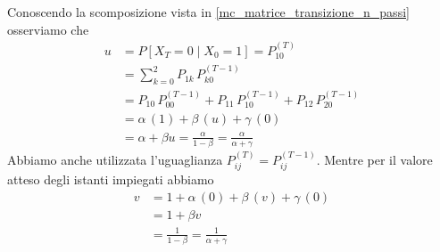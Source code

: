 \documentclass{article}
\begin{document}
Conoscendo la scomposizione vista in \ref{mc_matrice_transizione_n_passi} osserviamo che
\begin{align*}
u &= P[X_T = 0 \mid X_0 = 1] = P_{10}^{(T)}\\
&= \sum_{k = 0}^2 P_{1k}\,P_{k0}^{(T-1)}\\
&= P_{10}\,P_{00}^{(T-1)} + P_{11}\,P_{10}^{(T-1)} + P_{12}\,P_{20}^{(T-1)}\\
&= \alpha\,(1) + \beta\,(u) + \gamma\,(0)\\
&= \alpha + \beta u = \frac{\alpha}{1-\beta} = \frac{\alpha}{\alpha + \gamma}
\end{align*}
Abbiamo anche utilizzata l'uguaglianza $P_{ij}^{(T)} = P_{ij}^{(T-1)}$. Mentre per il valore atteso degli istanti impiegati abbiamo
\begin{align*}
v &= 1 + \alpha\,(0) + \beta\,(v) + \gamma\,(0)\\
&= 1 + \beta v\\
&= \frac{1}{1 - \beta} = \frac{1}{\alpha + \gamma}
\end{align*}\\
\end{document}

